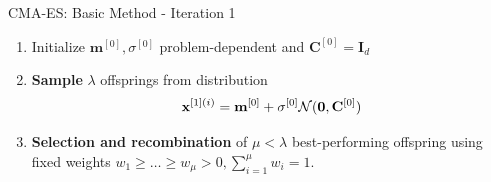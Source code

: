 \documentclass[11pt,compress,t,notes=noshow, xcolor=table]{beamer}
\begin{document}
\begin{vbframe}{CMA-ES: Basic Method - Iteration 1}

\begin{enumerate}
    \addtocounter{enumi}{-1}
    \item Initialize $\mathbf{m}^{[0]},\sigma^{[0]}$ problem-dependent and $\mathbf{C}^{[0]}=\mathbf{I}_{d}$

    \framebreak

    \item \textbf{Sample} $\lambda$ offsprings from distribution
    $$\mathbf{x}^{[1](i)} = \mathbf{m}^{[0]} + \sigma^{[0]} \mathcal{N}(\bm{0}, \mathbf{C}^{[0]})$$

    \item \textbf{Selection and recombination} of $\mu<\lambda$ best-performing offspring using fixed weights $w_1\geq\ldots\geq w_{\mu}>0,\sum_{i=1}^{\mu} w_i = 1$. %
    

\end{enumerate}
\end{vbframe}
\end{document}
